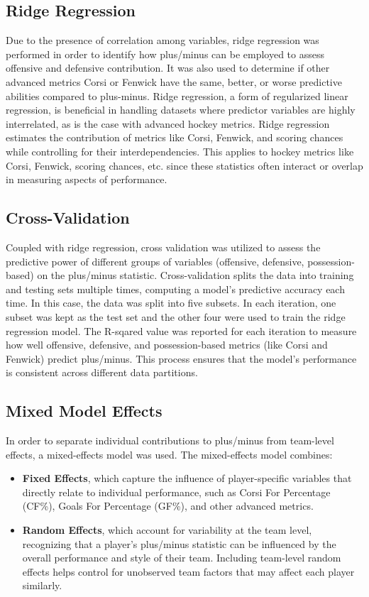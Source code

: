 \documentclass[12pt]{article}
\begin{document}
\subsection{Ridge Regression}

Due to the presence of correlation among variables, ridge regression was performed in order to identify how plus/minus can be employed 
to assess offensive and defensive contribution. It was also used to determine if other advanced metrics Corsi or Fenwick have the same, 
better, or worse predictive abilities compared to plus-minus. Ridge regression, a form of regularized linear regression, is beneficial 
in handling datasets where predictor variables are highly interrelated, as is the case with advanced hockey metrics. Ridge regression 
estimates the contribution of metrics like Corsi, Fenwick, and scoring chances while controlling for their interdependencies. This 
applies to hockey metrics like Corsi, Fenwick, scoring chances, etc. since these statistics often interact or overlap in measuring aspects 
of performance.

\subsection{Cross-Validation}

Coupled with ridge regression, cross validation was utilized to assess the predictive power of different groups of variables (offensive, 
defensive, possession-based) on the plus/minus statistic. Cross-validation splits the data into training and testing sets multiple times, 
computing a model's predictive accuracy each time. In this case, the data was split into five subsets. In each iteration, one subset was
kept as the test set and the other four were used to train the ridge regression model. The R-sqared value was reported for each iteration
to measure how well offensive, defensive, and possession-based metrics (like Corsi and Fenwick) predict plus/minus. This process ensures 
that the model’s performance is consistent across different data partitions.

\subsection{Mixed Model Effects}

In order to separate individual contributions to plus/minus from team-level effects, a mixed-effects model was used. 
The mixed-effects model combines:
\begin{itemize}
    \item \textbf{Fixed Effects}, which capture the influence of player-specific variables that directly relate to individual performance, 
    such as Corsi For Percentage (CF\%), Goals For Percentage (GF\%), and other advanced metrics.
    \item \textbf{Random Effects}, which account for variability at the team level, recognizing that a player’s plus/minus statistic can be 
    influenced by the overall performance and style of their team. Including team-level random effects helps control for unobserved team 
    factors that may affect each player similarly.
\end{itemize}
\end{document}
